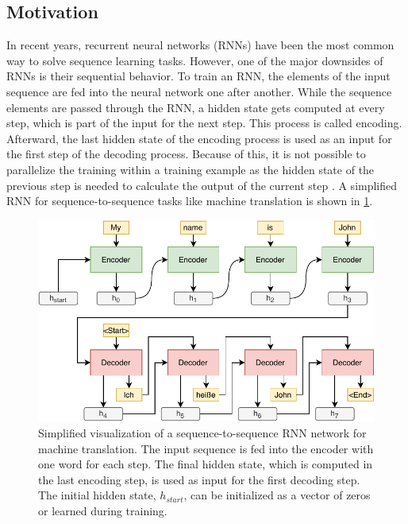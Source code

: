 \subsection{Motivation}\label{ssec:transformer-motivation}

In recent years, recurrent neural networks (RNNs) have been the most common way to solve sequence learning tasks.
However, one of the major downsides of RNNs is their sequential behavior.
To train an RNN, the elements of the input sequence are fed into the neural network one after another.
While the sequence elements are passed through the RNN, a hidden state gets computed at every step, which is part of the input for the next step.
This process is called encoding.
Afterward, the last hidden state of the encoding process is used as an input for the first step of the decoding process.
Because of this, it is not possible to parallelize the training within a training example as the hidden state of the previous step is needed to calculate the output of the current step \cite[p.~2]{1706.03762}.
A simplified RNN for sequence-to-sequence tasks like machine translation is shown in \cref{fig:rnn-visualization}.

\begin{figure}[h]
\centering
\includegraphics{figures/rnn-visualization}
\caption[Simplified visualization of a sequence-to-sequence RNN network for machine translation]{Simplified visualization of a sequence-to-sequence RNN network for machine translation. The input sequence is fed into the encoder with one word for each step. The final hidden state, which is computed in the last encoding step, is used as input for the first decoding step. The initial hidden state, $h_{start}$, can be initialized as a vector of zeros or learned during training.}
\label{fig:rnn-visualization}
\end{figure}

